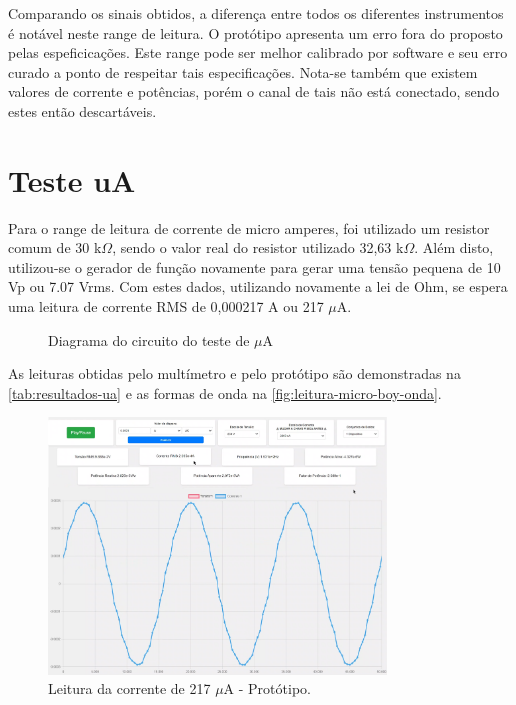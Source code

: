 Comparando os sinais obtidos, a diferença entre todos os diferentes instrumentos é notável neste range de leitura. O protótipo apresenta um erro fora do proposto pelas espeficicações. Este range pode ser melhor calibrado por software e seu erro curado a ponto de respeitar tais especificações. Nota-se também que existem valores de corrente e potências, porém o canal de tais não está conectado, sendo estes então descartáveis.

\section{Teste uA}\label{teste-ua}

Para o range de leitura de corrente de micro amperes, foi utilizado um resistor comum de 30 k$\Omega$, sendo o valor real do resistor utilizado 32,63 k$\Omega$. Além disto, utilizou-se o gerador de função novamente para gerar uma tensão pequena de 10 Vp ou 7.07 Vrms. Com estes dados, utilizando novamente a lei de Ohm, se espera uma leitura de corrente RMS de 0,000217 A ou 217 $\mu$A.

\begin{figure}[htb!]
    \caption{Diagrama do circuito do teste de $\mu$A}
    \vspace*{5mm}
    \label{fig:circ-ua}
    \fonte{}
\end{figure}

As leituras obtidas pelo multímetro e pelo protótipo são demonstradas na \autoref{tab:resultados-ua} e as formas de onda na \autoref{fig:leitura-micro-boy-onda}.

\begin{figure}[htb!]
    \caption{Leitura da corrente de 217 $\mu$A - Protótipo.}
    \vspace*{5mm}
    \label{fig:leitura-micro-boy-onda}
    \includegraphics[width=0.8\textwidth]{figuras/leitura-micro-boy-onda.png}
    \fonte{}
\end{figure}

